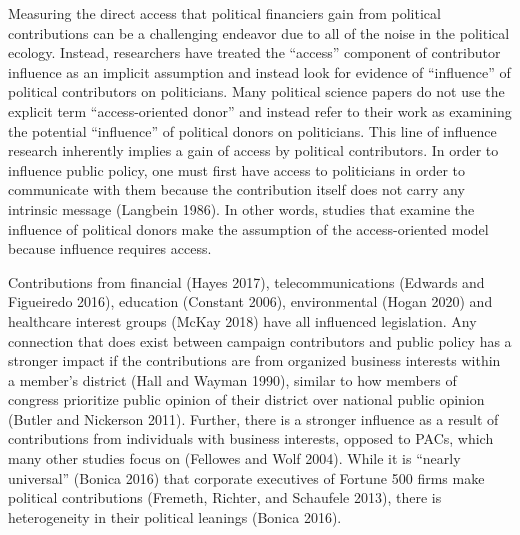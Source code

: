 \documentclass[12pt,]{article}
\begin{document}
Measuring the direct access that political financiers gain from
political contributions can be a challenging endeavor due to all of the
noise in the political ecology. Instead, researchers have treated the
``access'' component of contributor influence as an implicit assumption
and instead look for evidence of ``influence'' of political contributors
on politicians. Many political science papers do not use the explicit
term ``access-oriented donor'' and instead refer to their work as
examining the potential ``influence'' of political donors on
politicians. This line of influence research inherently implies a gain
of access by political contributors. In order to influence public
policy, one must first have access to politicians in order to
communicate with them because the contribution itself does not carry any
intrinsic message (Langbein 1986). In other words, studies that examine
the influence of political donors make the assumption of the
access-oriented model because influence requires access.

Contributions from financial (Hayes 2017), telecommunications (Edwards
and Figueiredo 2016), education (Constant 2006), environmental (Hogan
2020) and healthcare interest groups (McKay 2018) have all influenced
legislation. Any connection that does exist between campaign
contributors and public policy has a stronger impact if the
contributions are from organized business interests within a member's
district (Hall and Wayman 1990), similar to how members of congress
prioritize public opinion of their district over national public opinion
(Butler and Nickerson 2011). Further, there is a stronger influence as a
result of contributions from individuals with business interests,
opposed to PACs, which many other studies focus on (Fellowes and Wolf
2004). While it is ``nearly universal'' (Bonica 2016) that corporate
executives of Fortune 500 firms make political contributions (Fremeth,
Richter, and Schaufele 2013), there is heterogeneity in their political
leanings (Bonica 2016).
\end{document}
